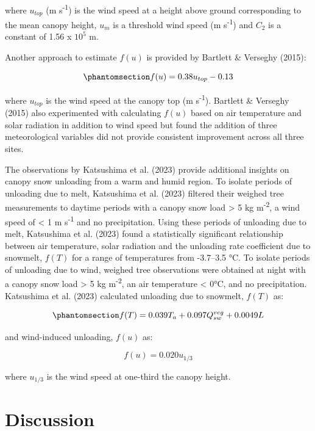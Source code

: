 \documentclass[
  letterpaper,
]{tex/uofsthesis-cs}
\begin{document}
where \(u_{top}\) (m s\textsuperscript{-1}) is the wind speed at a
height above ground corresponding to the mean canopy height, \(u_m\) is
a threshold wind speed (m s\textsuperscript{-1}) and \(C_2\) is a
constant of 1.56 x \(10^5\) m.

Another approach to estimate \(f(u)\) is provided by Bartlett \&
Verseghy (2015):

\begin{equation}\phantomsection\label{eq-bartlett-unload-v}{
f(u) = 0.38u_{top} -0.13
}\end{equation}

where \(u_{top}\) is the wind speed at the canopy top (m
s\textsuperscript{-1}). Bartlett \& Verseghy (2015) also experimented
with calculating \(f(u)\) based on air temperature and solar radiation
in addition to wind speed but found the addition of three meteorological
variables did not provide consistent improvement across all three sites.

The observations by Katsushima et al. (2023) provide additional insights
on canopy snow unloading from a warm and humid region. To isolate
periods of unloading due to melt, Katsushima et al. (2023) filtered
their weighed tree measurements to daytime periods with a canopy snow
load \textgreater{} 5 kg m\textsuperscript{-2}, a wind speed of
\textless{} 1 m s\textsuperscript{-1} and no precipitation. Using these
periods of unloading due to melt, Katsushima et al. (2023) found a
statistically significant relationship between air temperature, solar
radiation and the unloading rate coefficient due to snowmelt, \(f(T)\)
for a range of temperatures from -3.7--3.5 °C. To isolate periods of
unloading due to wind, weighed tree observations were obtained at night
with a canopy snow load \textgreater{} 5 kg m\textsuperscript{-2}, an
air temperature \textless{} 0°C, and no precipitation. Katsushima et al.
(2023) calculated unloading due to snowmelt, \(f(T)\) as:

\begin{equation}\phantomsection\label{eq-kat-fmelt}{
f(T) = 0.039T_a+0.097Q_{sw}^{veg}+0.0049L
}\end{equation}

and wind-induced unloading, \(f(u)\) as:

\[
f(u) = 0.020u_{1/3}
\]

where \(u_{1/3}\) is the wind speed at one-third the canopy height.

\section{Discussion}\label{discussion}
\end{document}
